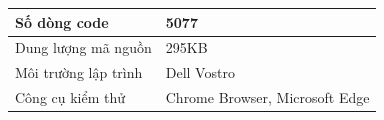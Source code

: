 \documentclass[../DoAn.tex]{subfiles}
\begin{document}
    \tabletail{\hline}
    \label{bang412}
    \begin{supertabular}{| p{.45\textwidth}| p{.45\textwidth} |} 
    \hline
        Số dòng code& 5077\\\hline
        Dung lượng mã nguồn&295KB \\\hline
        Môi trường lập trình&Dell Vostro \\\hline
        Công cụ kiểm thử & Chrome Browser, Microsoft Edge\\\hline
    \end{supertabular}
\end{document}
